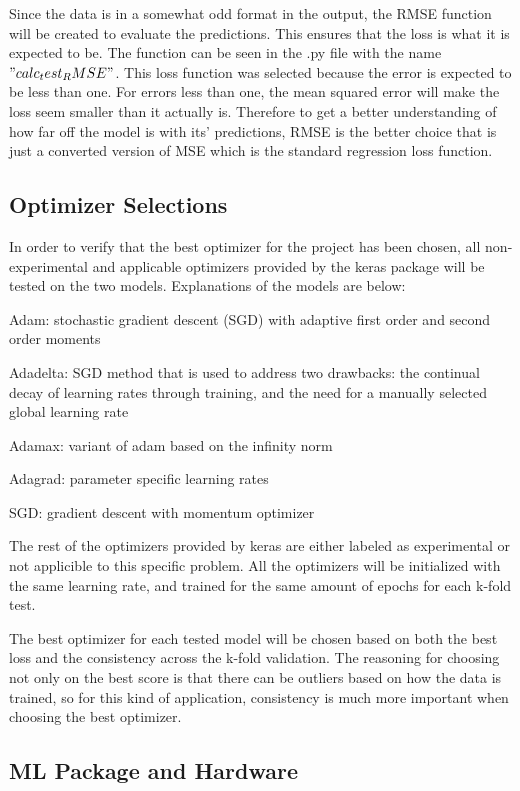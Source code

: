 \documentclass[12pt]{article}
\begin{document}
	Since the data is in a somewhat odd format in the output, the RMSE function will be created to evaluate the predictions. This ensures that the loss is what it is expected to be. The function can be seen in the .py file with the name $"calc_test_RMSE"$. This loss function was selected because the error is expected to be less than one. For errors less than one, the mean squared error will make the loss seem smaller than it actually is. Therefore to get a better understanding of how far off the model is with its' predictions, RMSE is the better choice that is just a converted version of MSE which is the standard regression loss function.

	\subsection*{Optimizer Selections}

	In order to verify that the best optimizer for the project has been chosen, all non-experimental and applicable optimizers provided by the keras package will be tested on the two models. Explanations of the models are below:

	Adam: stochastic gradient descent (SGD) with adaptive first order and second order moments

	Adadelta: SGD method that is used to address two drawbacks: the continual decay of learning rates through training, and the need for a manually selected global learning rate

	Adamax: variant of adam based on the infinity norm

	Adagrad: parameter specific learning rates

	SGD: gradient descent with momentum optimizer

	The rest of the optimizers provided by keras are either labeled as experimental or not applicible to this specific problem. All the optimizers will be initialized with the same learning rate, and trained for the same amount of epochs for each k-fold test.

	The best optimizer for each tested model will be chosen based on both the best loss and the consistency across the k-fold validation. The reasoning for choosing not only on the best score is that there can be outliers based on how the data is trained, so for this kind of application, consistency is much more important when choosing the best optimizer.

	\subsection*{ML Package and Hardware}
\end{document}
